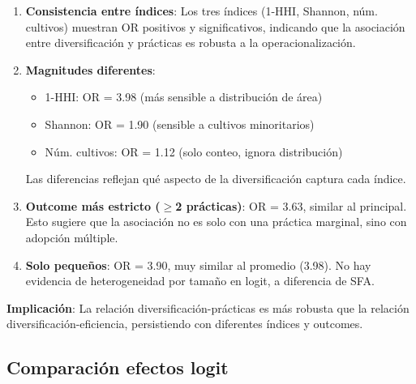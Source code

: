 \documentclass[11pt,a4paper]{article}
\begin{document}
\begin{enumerate}
    \item \textbf{Consistencia entre índices}: Los tres índices (1-HHI, Shannon, núm. cultivos) muestran OR positivos y significativos, indicando que la asociación entre diversificación y prácticas es robusta a la operacionalización.
    
    \item \textbf{Magnitudes diferentes}: 
    \begin{itemize}
        \item 1-HHI: OR = 3.98 (más sensible a distribución de área)
        \item Shannon: OR = 1.90 (sensible a cultivos minoritarios)
        \item Núm. cultivos: OR = 1.12 (solo conteo, ignora distribución)
    \end{itemize}
    Las diferencias reflejan qué aspecto de la diversificación captura cada índice.
    
    \item \textbf{Outcome más estricto ($\geq$2 prácticas)}: OR = 3.63, similar al principal. Esto sugiere que la asociación no es solo con una práctica marginal, sino con adopción múltiple.
    
    \item \textbf{Solo pequeños}: OR = 3.90, muy similar al promedio (3.98). No hay evidencia de heterogeneidad por tamaño en logit, a diferencia de SFA.
\end{enumerate}

\textbf{Implicación}: La relación diversificación-prácticas es más robusta que la relación diversificación-eficiencia, persistiendo con diferentes índices y outcomes.

\subsection{Comparación efectos logit}
\end{document}
